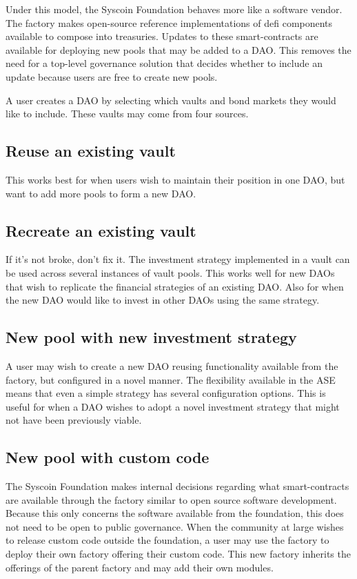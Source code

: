 \documentclass[journal,twocolumn,12pt]{ieeesyscoin}
\begin{document}
Under this model, the Syscoin Foundation behaves more like a software vendor. The factory makes open-source reference implementations of defi components available to compose into treasuries. Updates to these smart-contracts are available for deploying new pools that may be added to a DAO. This removes the need for a top-level governance solution that decides whether to include an update because users are free to create new pools.

A user creates a DAO by selecting which vaults and bond markets they would like to include. These vaults may come from four sources.

\subsection{Reuse an existing vault}

This works best for when users wish to maintain their position in one DAO, but want to add more pools to form a new DAO.

\subsection{Recreate an existing vault}

If it’s not broke, don’t fix it. The investment strategy implemented in a vault can be used across several instances of vault pools. This works well for new DAOs that wish to replicate the financial strategies of an existing DAO. Also for when the new DAO would like to invest in other DAOs using the same strategy.


\subsection{New pool with new investment strategy}

A user may wish to create a new DAO reusing functionality available from the factory, but configured in a novel manner. The flexibility available in the ASE means that even a simple strategy has several configuration options. This is useful for when a DAO wishes to adopt a novel investment strategy that might not have been previously viable.

\subsection{New pool with custom code}

The Syscoin Foundation makes internal decisions regarding what smart-contracts are available through the factory similar to open source software development. Because this only concerns the software available from the foundation, this does not need to be open to public governance. When the community at large wishes to release custom code outside the foundation, a user may use the factory to deploy their own factory offering their custom code. This new factory inherits the offerings of the parent factory and may add their own modules.
\end{document}
